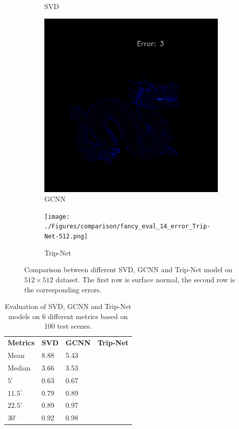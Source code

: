 \documentclass[border=15pt, multi, tikz]{article}
\newcommand{\tabhead}[1]{\textbf{#1}}
\begin{document}
\begin{figure}[H]
\begin{subfigure}[b]{0.24\linewidth}
		\caption{SVD}
	\end{subfigure}
	\begin{subfigure}[b]{0.24\linewidth}
		\includegraphics[width=\linewidth]{./Figures/comparison/fancy_eval_22_error_GCNN-512.png}
		\caption{GCNN}
	\end{subfigure}
	\begin{subfigure}[b]{0.24\linewidth}
		\texttt{[image: ./Figures/comparison/fancy\_eval\_14\_error\_Trip-Net-512.png]}
		\caption{Trip-Net}
	\end{subfigure}

	
	
	\caption{Comparison between different SVD, GCNN and Trip-Net model on $ 512\times 512 $ dataset. The first row is surface normal, the second row is the corresponding errors. }
	\label{fig:high_resolution_eval}
\end{figure}

\begin{table}[H]
	\centering
	\begin{tabular}{l l l l }
		\tabhead{Metrics} & \tabhead{SVD} & \tabhead{GCNN} & \tabhead{Trip-Net} \\
		Mean  					& 8.88 & 5.43 & \\ 
		\hline
		Median					& 3.66 & 3.53 & \\ 
		\hline
		$ 5^\circ $ 			& 0.63 & 0.67 & \\
		\hline
		$ 11.5^\circ $ 			& 0.79 & 0.89 & \\
		\hline
		$ 22.5^\circ $ 			& 0.89 & 0.97 & \\
		\hline
		$ 30^\circ $ 			& 0.92 & 0.98 & \\
	\end{tabular}
	\caption{Evaluation of SVD, GCNN and Trip-Net models on 6 different metrics based on 100 test scenes.}	
	\label{tab:high_resolution_eval}
\end{table}
\end{document}
